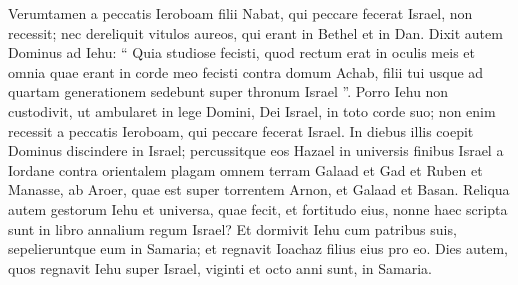 \begin{biblechapter}
\begin{biblechapter}
\begin{biblechapter}
\begin{biblechapter}
\begin{biblechapter}
\begin{biblechapter}
\begin{biblechapter}
\begin{biblechapter}
\begin{biblechapter}
\begin{biblechapter}
\verse Verumtamen a peccatis Ieroboam filii Nabat, qui peccare fecerat Israel, non recessit; nec dereliquit vitulos aureos, qui erant in Bethel et in Dan.
 \verse Dixit autem Dominus ad Iehu: “ Quia studiose fecisti, quod rectum erat in oculis meis et omnia quae erant in corde meo fecisti contra domum Achab, filii tui usque ad quartam generationem sedebunt super thronum Israel ”. 
\verse Porro Iehu non custodivit, ut ambularet in lege Domini, Dei Israel, in toto corde suo; non enim recessit a peccatis Ieroboam, qui peccare fecerat Israel.
 \verse In diebus illis coepit Dominus discindere in Israel; percussitque eos Hazael in universis finibus Israel 
\verse a Iordane contra orientalem plagam omnem terram Galaad et Gad et Ruben et Manasse, ab Aroer, quae est super torrentem Arnon, et Galaad et Basan.
 \verse Reliqua autem gestorum Iehu et universa, quae fecit, et fortitudo eius, nonne haec scripta sunt in libro annalium regum Israel? 
\verse Et dormivit Iehu cum patribus suis, sepelieruntque eum in Samaria; et regnavit Ioachaz filius eius pro eo. 
\verse Dies autem, quos regnavit Iehu super Israel, viginti et octo anni sunt, in Samaria.
 

\end{biblechapter}
\end{biblechapter}
\end{biblechapter}
\end{biblechapter}
\end{biblechapter}
\end{biblechapter}
\end{biblechapter}
\end{biblechapter}
\end{biblechapter}
\end{biblechapter}
